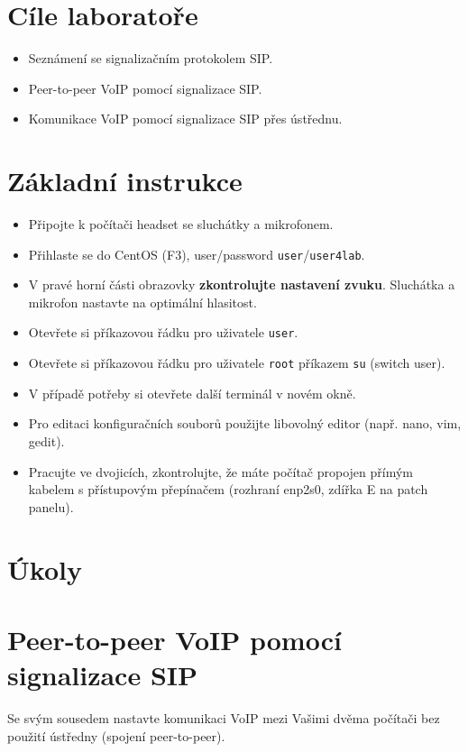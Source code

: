 
\section*{Cíle laboratoře}
\begin{itemize}
  \item Seznámení se signalizačním protokolem SIP.
  \item Peer-to-peer VoIP pomocí signalizace SIP.
  \item Komunikace VoIP pomocí signalizace SIP přes ústřednu.
\end{itemize}

\section*{Základní instrukce}
\begin{itemize}
  \item Připojte k počítači headset se sluchátky a mikrofonem.
  \item Přihlaste se do CentOS (F3), user/password {\tt user}/{\tt user4lab}.
  \item V pravé horní části obrazovky {\bf zkontrolujte nastavení zvuku}. Sluchátka a mikrofon nastavte na optimální hlasitost.
  \item Otevřete si příkazovou řádku pro uživatele {\tt user}.
  \item Otevřete si příkazovou řádku pro uživatele {\tt root} příkazem {\tt su} (switch user).
  \item V případě potřeby si otevřete další terminál v novém okně.
  \item Pro editaci konfiguračních souborů použijte libovolný editor (např. nano, vim, gedit).
  \item Pracujte ve dvojicích, zkontrolujte, že máte počítač propojen
    přímým kabelem s přístupovým přepínačem (rozhraní enp2s0, zdířka E na patch panelu).
\end{itemize}

\section*{Úkoly}
\section{Peer-to-peer VoIP pomocí signalizace SIP}
Se svým sousedem nastavte komunikaci VoIP mezi Vašimi dvěma počítači bez použití ústředny (spojení peer-to-peer).

